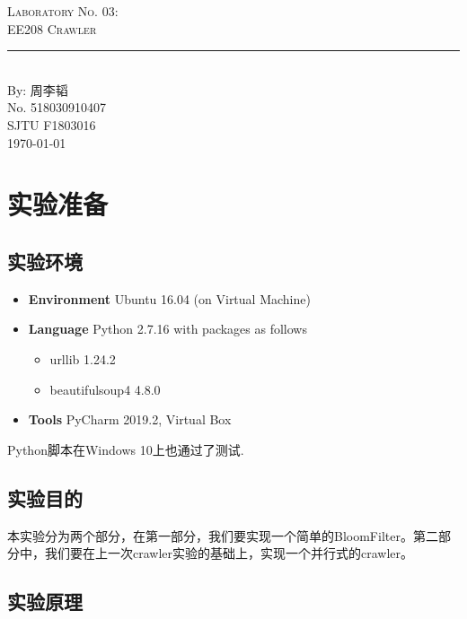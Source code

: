 \documentclass{article}
\newcommand{\labno}{03}
\newcommand{\labtitle}{EE208 Crawler}
\newcommand{\authorname}{周李韬}
\newcommand{\studentno}{518030910407}
\newcommand{\classno}{F1803016}
\begin{document}
\begin{center}
{\LARGE \textsc{Laboratory No. \labno:} \\ \vspace{4pt}}
{\Large \textsc{\labtitle} \\ \vspace{4pt}} 
\rule[13pt]{\textwidth}{1pt} \\ \vspace{15pt}
{\large By: \authorname \\ \vspace{10pt}
No. \studentno \\ \vspace{10pt}
SJTU \classno \\ \vspace{10pt}
\today \vspace{20pt}}
\end{center}



\section{实验准备}

\subsection{实验环境}
\begin{itemize}
\item\textbf{Environment} Ubuntu 16.04 (on Virtual Machine)
\item\textbf{Language} Python 2.7.16 with packages as follows
	\begin{itemize}
	\item urllib 1.24.2
	\item beautifulsoup4 4.8.0
	\end{itemize}
\item\textbf{Tools} PyCharm 2019.2, Virtual Box
\end{itemize}
Python脚本在Windows 10上也通过了测试.

\subsection{实验目的}
本实验分为两个部分，在第一部分，我们要实现一个简单的BloomFilter。第二部分中，我们要在上一次crawler实验的基础上，实现一个并行式的crawler。

\subsection{实验原理}
\label{sec:principle}
\end{document}
